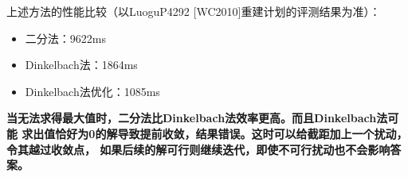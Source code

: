 上述方法的性能比较（以LuoguP4292 [WC2010]重建计划的评测结果为准）：
\begin{itemize}
	\item 二分法：9622ms
	\item Dinkelbach法：1864ms
	\item Dinkelbach法优化：1085ms
\end{itemize}


{\bfseries 当无法求得最大值时，二分法比Dinkelbach法效率更高。而且Dinkelbach法可能
求出值恰好为0的解导致提前收敛，结果错误。这时可以给截距加上一个扰动，令其越过收敛点，
如果后续的解可行则继续迭代，即使不可行扰动也不会影响答案。}
